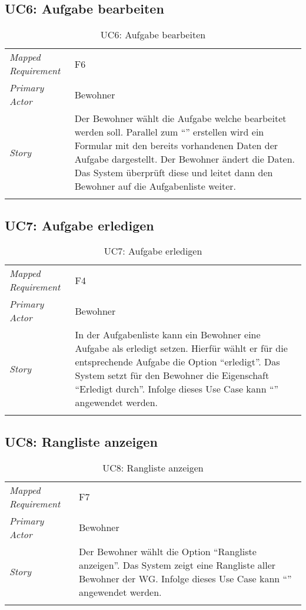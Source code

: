 \subsection{UC6: Aufgabe bearbeiten}\label{subsec:uc6}
\begin{table}[H]
	\tablestyle
	\tablealtcolored
	\begin{tabularx}{\textwidth}{lX}
		\tablebody
			\textit{Mapped Requirement} &
			F6
			\tabularnewline
			\textit{Primary Actor} &
			Bewohner
			\tabularnewline
			\textit{Story} &
			Der Bewohner wählt die Aufgabe welche bearbeitet werden soll. Parallel zum ``\nameref{subsec:uc5}'' erstellen wird ein Formular mit den bereits vorhandenen Daten der Aufgabe dargestellt. Der Bewohner ändert die Daten. Das System überprüft diese und leitet dann den Bewohner auf die Aufgabenliste weiter.
			\tabularnewline
		\tableend
	\end{tabularx}
	\caption{UC6: Aufgabe bearbeiten}
\end{table}


\subsection{UC7: Aufgabe erledigen}\label{subsec:uc7}
\begin{table}[H]
	\tablestyle
	\tablealtcolored
	\begin{tabularx}{\textwidth}{lX}
		\tablebody
			\textit{Mapped Requirement} &
			F4
			\tabularnewline
			\textit{Primary Actor} &
			Bewohner
			\tabularnewline
			\textit{Story} &
			In der Aufgabenliste kann ein Bewohner eine Aufgabe als erledigt setzen. Hierfür wählt er für die entsprechende Aufgabe die Option ``erledigt''. Das System setzt für den Bewohner die Eigenschaft ``Erledigt durch''.
			\newline Infolge dieses Use Case kann ``\nameref{subsec:uc11}'' angewendet werden.
			\tabularnewline
		\tableend
	\end{tabularx}
	\caption{UC7: Aufgabe erledigen}
\end{table}


\subsection{UC8: Rangliste anzeigen}\label{subsec:uc8}
\begin{table}[H]
	\tablestyle
	\tablealtcolored
	\begin{tabularx}{\textwidth}{lX}
		\tablebody
			\textit{Mapped Requirement} &
			F7
			\tabularnewline
			\textit{Primary Actor} &
			Bewohner
			\tabularnewline
			\textit{Story} &
			Der Bewohner wählt die Option ``Rangliste anzeigen''. Das System zeigt eine Rangliste aller Bewohner der WG.
			\newline Infolge dieses Use Case kann ``\nameref{subsec:uc11}'' angewendet werden.
			\tabularnewline
		\tableend
	\end{tabularx}
	\caption{UC8: Rangliste anzeigen}
\end{table}


